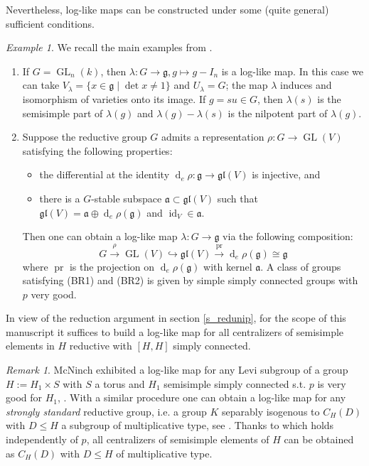 \documentclass[12pt]{amsart}
\theoremstyle{definition}
\theoremstyle{remark}
\newtheorem{Remark}[Theorem]{Remark}
\newtheorem{Example}[Theorem]{Example}
\newcommand{\g}{\mathfrak{g}}
\newcommand{\gl}{\mathfrak{gl}}
\renewcommand{\a}{\mathfrak{a}}
\newcommand{\pr}{\operatorname{pr}}
\newcommand{\diff}{\operatorname{d}}
\newcommand{\GL}{\operatorname{GL}}
\newcommand{\id}{\operatorname{id}}
\begin{document}
Nevertheless, log-like maps can be constructed under some (quite general) sufficient conditions.

\begin{Example}\label{ex_loglike}
We recall the main examples from \cite[\S 9.3]{BR}.
\begin{enumerate}
\item If $G = \GL_n(k)$, then $\lambda \colon G \to \g, g \mapsto  g - I_n$ is a log-like map.
In this case we can take $V_\lambda  = \{x \in \g \mid \det x \neq 1\}$ and $U_\lambda = G$; the map $\lambda$ induces and isomorphism of varieties onto its image.
If $g = su \in G$, then $\lambda(s)$ is the semisimple part of $\lambda(g)$ and $\lambda(g) - \lambda(s)$ is the nilpotent part of $\lambda(g)$.
\item Suppose the reductive group $G$ admits a  representation
$\rho \colon G \to \GL(V)$ satisfying the following properties:
\begin{itemize}
\item[(BR1)] the differential at the identity $\diff_e \rho \colon \g \to \gl(V)$ is injective, and
\item[(BR2)] there is a $G$-stable subspace $\a \subset \gl(V)$ such that $\gl(V) = \a \oplus \diff_e \rho(\g)$ and  $\id_V \in \a$.
\end{itemize}
Then one can obtain a log-like map $\lambda \colon G \to \g$ via the following composition:
$$ G \xrightarrow{\rho} 
\GL(V) \hookrightarrow \gl(V) 
\xrightarrow{\pr} \diff_e \rho(\g) \cong \g$$
where $\pr$ is the projection on $\diff_e \rho(\g)$ with kernel $\a$.
A class of groups  satisfying (BR1) and (BR2) is given by simple simply connected groups with $p$ very good.
\end{enumerate}
\end{Example}

In view of the reduction argument in section \ref{s_redunip}, for the scope of this manuscript it suffices to build a 
log-like map for all centralizers of semisimple elements in $H$ reductive with $[H,H]$ simply connected.

\begin{Remark} \label{rmk_mcninch}
McNinch exhibited a log-like map for any Levi subgroup of a group $H := H_1 \times S$ with $S$ a torus  and $H_1$  semisimple simply connected s.t. $p$ is very good for $H_1$, \cite[Theorem 54]{McN_NOgood}.
With a similar procedure one can obtain a log-like map  for any \emph{strongly standard} reductive group, i.e. a group $K$ separably isogenous to $C_H(D)$ with $D \leq H$ a subgroup of multiplicative type, see \cite[\S 2.4]{McNTes}.
Thanks to \cite[Lemma 17]{McNS} which holds independently of $p$,  all centralizers of semisimple elements of $H$ can be obtained as $C_H(D)$ with $D \leq H$ of multiplicative type.
\end{Remark}
\end{document}
